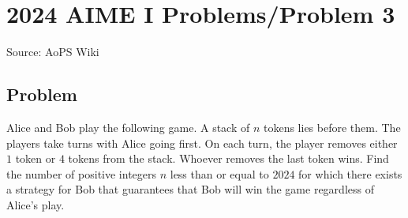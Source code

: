 \documentclass[12pt]{article}
\begin{document}
\section*{{2024 AIME I Problems/Problem 3}}
Source: AoPS Wiki

\subsection*{Problem}
Alice and Bob play the following game. A stack of $n$ tokens lies before them. The players take turns with Alice going first. On each turn, the player removes either $1$ token or $4$ tokens from the stack. Whoever removes the last token wins. Find the number of positive integers $n$ less than or equal to $2024$ for which there exists a strategy for Bob that guarantees that Bob will win the game regardless of Alice's play.
\end{document}
